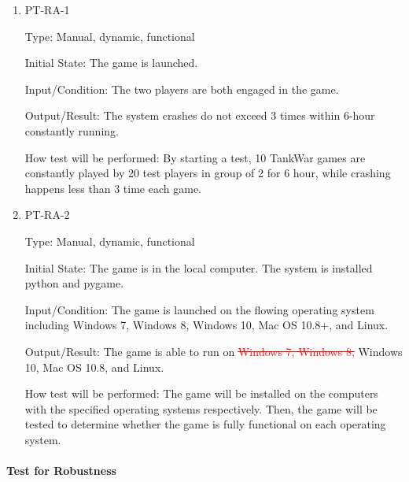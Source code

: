 \documentclass[12pt, titlepage]{article}
\begin{document}
\begin{enumerate}

\item{PT-RA-1\\}

Type: Manual, dynamic, functional
					
Initial State: The game is launched.
					
Input/Condition: The two players are both engaged in the game.
					
Output/Result: The system crashes do not exceed 3 times within 6-hour constantly running.
					
How test will be performed: By starting a test, 10 TankWar games are constantly played by 20 test players in group of 2 for 6 hour, while crashing happens less than 3 time each game.

\item{PT-RA-2\\}

Type: Manual, dynamic, functional
					
Initial State: The game is in the local computer. The system is installed python and pygame.
					
Input/Condition: The game is launched on the flowing operating system including Windows 7, Windows 8, Windows 10, Mac OS 10.8+, and Linux.
					
Output/Result: The game is able to run on \textcolor{red}{\sout{Windows 7, Windows 8, }}Windows 10, Mac OS 10.8, and Linux.
					
How test will be performed: The game will be installed on the computers with the specified operating systems respectively. Then, the game will be tested to determine whether the game is fully functional on each operating system.

\end{enumerate}

\paragraph{Test for Robustness}
\end{document}
